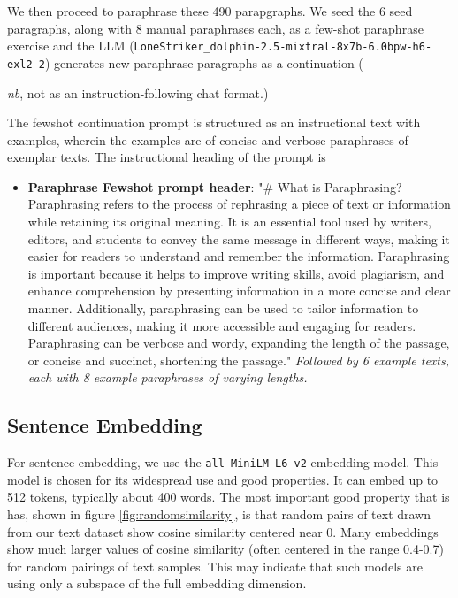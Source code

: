 \documentclass{article}
\begin{document}
We then proceed to paraphrase these 490 parapgraphs.  
We seed the 6 seed paragraphs, along with 8 manual paraphrases each, as a few-shot paraphrase exercise and the LLM  (\texttt{LoneStriker\_dolphin-2.5-mixtral-8x7b-6.0bpw-h6-exl2-2}) generates new paraphrase paragraphs as a continuation ({\textit{nb}, not as an instruction-following chat format.)

The fewshot continuation prompt is structured as an instructional text with examples, wherein the examples are of concise and verbose paraphrases of exemplar texts.  
The instructional heading of the prompt is

\begin{itemize}
	\item \textbf{Paraphrase Fewshot prompt header}: "\# What is Paraphrasing?
	Paraphrasing refers to the process of rephrasing a piece of text or information while retaining its original meaning. It is an essential tool 
	used by writers, editors, and students to convey the same message in different ways, making it easier for readers to understand and remember the information. Paraphrasing is important because it helps to improve writing skills, avoid plagiarism, and enhance comprehension by presenting information in a more concise and clear manner. Additionally, paraphrasing can be used to tailor information to different audiences, making 
	it more accessible and engaging for readers.  Paraphrasing can be verbose and wordy, expanding the length of the passage, or concise and succinct, shortening the passage." \textit{Followed by 6 example texts, each with 8 example paraphrases of varying lengths.}
\end{itemize}



\subsection{Sentence Embedding}

For sentence embedding, we use the \texttt{all-MiniLM-L6-v2} \citet{DBLP:journals/corr/abs-2002-10957} embedding model.
This model is chosen for its widespread use and good properties.  
It can embed up to 512 tokens, typically about 400 words.
The most important good property that is has, shown in figure \ref{fig:randomsimilarity}, is that random pairs of text drawn from our text dataset show cosine similarity centered near 0.  
Many embeddings show much larger values of cosine similarity (often centered in the range 0.4-0.7) for random pairings of text samples.
This may indicate \citet{badembeddings} that such models are using only a subspace of the full embedding dimension.

}
\end{document}
